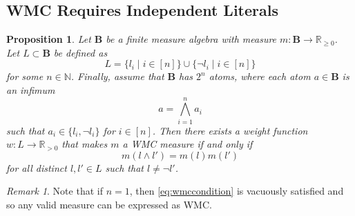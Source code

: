 \documentclass{article}
\newtheorem{proposition}{Proposition}
\theoremstyle{definition}
\theoremstyle{remark}
\newtheorem*{remark}{Remark}
\begin{document}
\subsection{WMC Requires Independent Literals}


\begin{proposition}
  Let $\mathbf{B}$ be a finite measure algebra with measure $m : \mathbf{B} \to
  \mathbb{R}_{\ge 0}$. Let $L \subset \mathbf{B}$ be defined as
  \[
  L = \{ l_i \mid i \in [n] \} \cup \{ \neg l_i \mid i \in [n] \}
  \]
  for some $n \in \mathbb{N}$. Finally, assume that $\mathbf{B}$ has $2^n$
  atoms, where each atom $a \in \mathbf{B}$ is an infimum
  \[
    a = \bigwedge_{i=1}^n a_i
  \]
  such that $a_i \in \{ l_i, \neg l_i \}$ for $i \in [n]$. Then there exists a
  weight function $w : L \to \mathbb{R}_{>0}$ that makes $m$ a WMC measure if
  and only if
  \begin{equation} \label{eq:wmccondition}
  m(l \land l') = m(l)m(l')
  \end{equation}
  for all distinct $l, l' \in L$ such that $l \ne \neg l'$.
\end{proposition}

\begin{remark}
  Note that if $n = 1$, then \cref{eq:wmccondition} is vacuously satisfied and
  so any valid measure can be expressed as WMC.
\end{remark}
\end{document}
